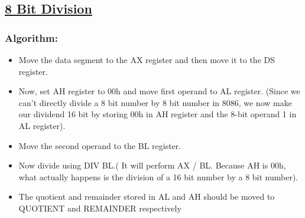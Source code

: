 \documentclass[12pt,a4paper]{article}
\begin{document}
\begin{flushleft}
\newpage
\subsection*{\textbf{\underline{8 Bit Division}}}

\subsubsection*{\textbf{Algorithm:}}
\begin{itemize}
    \item Move the data segment to the AX register and then move it to the DS register.
\item  Now, set AH register to 00h and move first operand to AL register. (Since we can’t directly divide a 8 bit number by 8 bit number in
8086, we now make our dividend 16 bit by storing 00h in AH register and the 8-bit operand 1 in AL register).
\item  Move the second operand to the BL register.
\item  Now divide using DIV BL.( It will perform AX / BL. Because AH is 00h, what actually happens is the division of a 16 bit number by a
8 bit number).
\item  The quotient and remainder stored in AL and AH should be moved to QUOTIENT and REMAINDER respectively
\end{itemize}


\end{flushleft}
\end{document}
